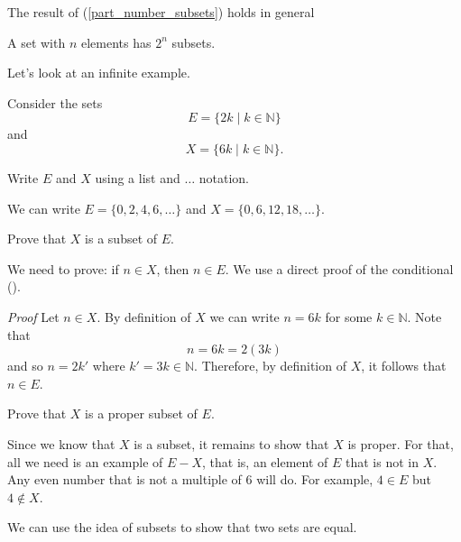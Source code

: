 The result of  (\ref{part_number_subsets}) holds in general

\begin{thm}
\label{thm_number_subsets} 
    A set with $n$ elements has $2^n$ subsets.
\end{thm}

Let's look at an infinite example.

\begin{exam}
\label{exam_mult6_subset_evens}
    Consider the sets 
        $$E=\{2k \mid k \in \mathbb{N}\}$$
    and 
        $$X = \{6k \mid k \in \mathbb{N}\}.$$
        \begin{apart}
            \item Write $E$ and $X$ using a list and $\ldots$ notation.
                \begin{soln}
                    We can write $E = \{0,2,4,6, \ldots\}$ and $X = \{0,6,12,18,\ldots\}$.
                \end{soln}
            \item \label{part_subset_proof} Prove that $X$ is a subset of $E$.
                \begin{soln}
                    We need to prove: if $n \in X$, then $n \in E$.  We use a direct proof of the conditional ().

                    \emph{Proof} Let $n \in X$. By definition of $X$ we can write $n = 6k$ for some $k \in \mathbb{N}$.  Note that $$n = 6k=2(3k)$$
                    and so $n = 2k'$ where $k'=3k \in \mathbb{N}$.  Therefore, by definition of $X$, it follows that $n \in E$.
                \end{soln}
            \item Prove that $X$ is a proper subset of $E$.
                \begin{soln}
                    Since we know that $X$ is a subset, it remains to show that $X$ is proper.  For that, all we need is an example of $E-X$, that is, an element of $E$ that is not in $X$.  Any even number that is not a multiple of 6 will do.  For example, $4 \in E$ but $4 \notin X$.
                \end{soln}
        \end{apart}
\end{exam}

We can use the idea of subsets to show that two sets are equal.

